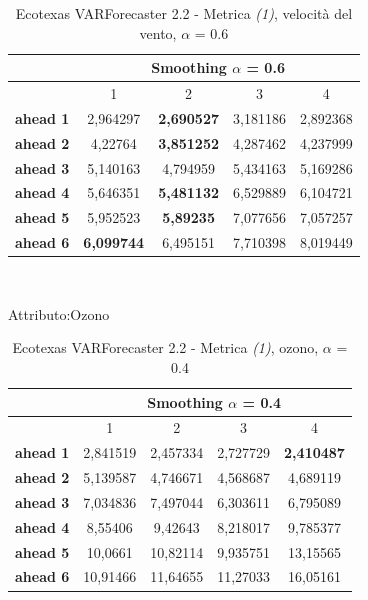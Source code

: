 \documentclass[12pt,a4paper,oneside,openright]{book}
\begin{document}
\medskip

\begin{table}[H]
\centering
\begin{tabular}{|c|c|c|c|c|}
\hline
 & \multicolumn{4}{|c|}{Smoothing $\alpha$ = 0.6} \\
\hline
& 1 & 2 & 3 & 4 \\
\hline
\textbf{ahead 1} & 2,964297 & \textbf{2,690527} & 3,181186 & 2,892368\\
\hline
\textbf{ahead 2} & 4,22764 & \textbf{3,851252} & 4,287462 & 4,237999\\ 
\hline
\textbf{ahead 3} & 5,140163 & 4,794959 & 5,434163 & 5,169286\\
\hline
\textbf{ahead 4} & 5,646351 & \textbf{5,481132} & 6,529889 & 6,104721\\ 
\hline
\textbf{ahead 5} & 5,952523 & \textbf{5,89235} & 7,077656 & 7,057257\\
\hline
\textbf{ahead 6} &  \textbf{6,099744}& 6,495151 & 7,710398 & 8,019449\\ 
\hline
\end{tabular} \\
\caption{Ecotexas VARForecaster 2.2 - Metrica \textit{(1)}, velocità del vento, $\alpha$ = 0.6}
\end{table} 

\medskip

Attributo:Ozono \\ 

\begin{table}[H]
\centering
\begin{tabular}{|c|c|c|c|c|}
\hline
 & \multicolumn{4}{|c|}{Smoothing $\alpha$ = 0.4} \\
\hline
& 1 & 2 & 3 & 4 \\
\hline
\textbf{ahead 1} & 2,841519 & 2,457334 & 2,727729 & \textbf{2,410487}\\
\hline
\textbf{ahead 2} & 5,139587 & 4,746671 & 4,568687 & 4,689119\\ 
\hline
\textbf{ahead 3} & 7,034836 & 7,497044 & 6,303611 & 6,795089\\
\hline
\textbf{ahead 4} & 8,55406 & 9,42643 & 8,218017 & 9,785377\\ 
\hline
\textbf{ahead 5} & 10,0661 & 10,82114 & 9,935751 & 13,15565\\
\hline
\textbf{ahead 6} & 10,91466 & 11,64655 & 11,27033 & 16,05161\\ 
\hline
\end{tabular} \\
\caption{Ecotexas VARForecaster 2.2 - Metrica \textit{(1)}, ozono, $\alpha$ = 0.4}
\end{table} 
\end{document}
